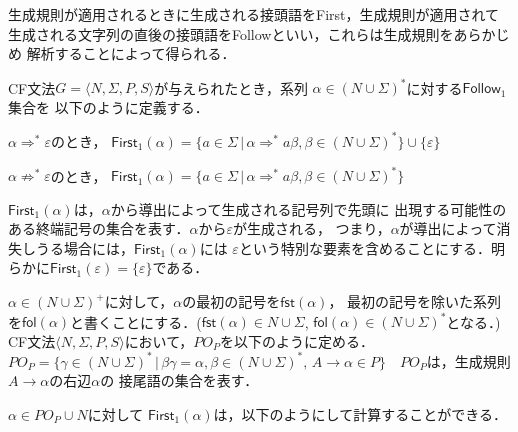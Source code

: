 \documentclass[dvipdfmx,a4j]{jbook}
\begin{document}
生成規則が適用されるときに生成される接頭語をFirst，生成規則が適用されて
生成される文字列の直後の接頭語をFollowといい，これらは生成規則をあらかじめ
解析することによって得られる．

\begin{Def}
  CF文法$G=\langle N,\Sigma,P,S\rangle$が与えられたとき，系列
  $\alpha\in(N\cup\Sigma)^\ast$に対する$\mathsf{Follow}_1$集合を
  以下のように定義する．
  \begin{list}{}{}
    \item $\alpha\Rightarrow^\ast\varepsilon$のとき，
    $\mathsf{First}_1(\alpha)=\{a\in\Sigma\,|\,
    \alpha\Rightarrow^\ast a\beta,\beta\in(N\cup\Sigma)^\ast\}\cup\{\varepsilon\}$
    \item $\alpha\not\Rightarrow^\ast\varepsilon$のとき，
    $\mathsf{First}_1(\alpha)=\{a\in\Sigma\,|\,
    \alpha\Rightarrow^\ast a\beta,\beta\in(N\cup\Sigma)^\ast\}$
  \end{list}
\end{Def}

$\mathsf{First}_1(\alpha)$は，$\alpha$から導出によって生成される記号列で先頭に
出現する可能性のある終端記号の集合を表す．$\alpha$から$\varepsilon$が生成される，
つまり，$\alpha$が導出によって消失しうる場合には，$\mathsf{First}_1(\alpha)$には
$\varepsilon$という特別な要素を含めることにする．明らかに$\mathsf{First}_1(\varepsilon)
=\{\varepsilon\}$である．

$\alpha\in(N\cup\Sigma)^+$に対して，$\alpha$の最初の記号を$\mathsf{fst}(\alpha)$，
最初の記号を除いた系列を$\mathsf{fol}(\alpha)$と書くことにする．($\mathsf{fst}(\alpha)\in
N\cup\Sigma$, $\mathsf{fol}(\alpha)\in(N\cup\Sigma)^\ast$となる．)
CF文法$\langle N,\Sigma,P,S\rangle$において，$PO_P$を以下のように定める．
$PO_P=\{\gamma\in(N\cup\Sigma)^\ast\,|\,\beta\gamma=\alpha, \beta\in(N\cup\Sigma)^\ast,\,
A\rightarrow\alpha\in P\}$　$PO_P$は，生成規則$A\rightarrow\alpha$の右辺$\alpha$の
接尾語の集合を表す．

$\alpha\in PO_P\cup N$に対して
$\mathsf{First}_1(\alpha)$は，以下のようにして計算することができる．
\end{document}
